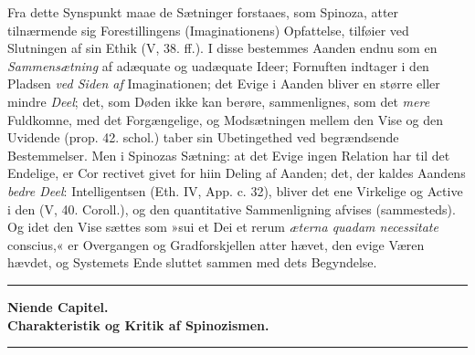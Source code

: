 \documentclass[12pt,a4paper]{book}
\newcommand{\opage}[1]{\marginnote{\footnotesize\textit{[#1]}}}
\begin{document}
Fra dette Synspunkt maae de Sætninger forstaaes, som
Spinoza, atter tilnærmende sig Forestillingens (Imaginationens)
Opfattelse, tilføier ved Slutningen af sin Ethik (V, 38. ff.).
I disse bestemmes Aanden endnu som en \emph{Sammensætning}
af adæquate og uadæquate Ideer; Fornuften indtager
i den Pladsen \emph{ved Siden af} Imaginationen; det Evige i
Aanden bliver en større eller mindre \emph{Deel}; det, som Døden
ikke kan berøre, sammenlignes, som det \emph{mere} Fuldkomne,
med det Forgængelige, og Modsætningen mellem den Vise
og den Uvidende (prop. 42. schol.) taber sin Ubetingethed
ved begrændsende Bestemmelser. Men i Spinozas Sætning:
at det Evige ingen Relation har til det Endelige, er Cor
\opage{171} rectivet givet for hiin Deling af Aanden; det, der kaldes
Aandens \emph{bedre Deel}: Intelligentsen (Eth. IV, App. c. 32),
bliver det ene Virkelige og Active i den (V, 40. Coroll.),
og den quantitative Sammenligning afvises (sammesteds).
Og idet den Vise sættes som »sui et Dei et rerum \emph{æterna
quadam necessitate} conscius,« er Overgangen og Gradforskjellen
atter hævet, den evige Væren hævdet, og Systemets Ende sluttet
sammen med dets Begyndelse.

\bigskip
\begin{center}\rule{2.5cm}{0.4pt}\end{center}   %
\bigskip

\begin{center}
{\large\textbf{Niende Capitel.}}\\[4pt]
\textbf{Charakteristik og Kritik af Spinozismen.}\\[6pt]
\rule{2cm}{0.4pt}
\end{center}
\bigskip
\end{document}
